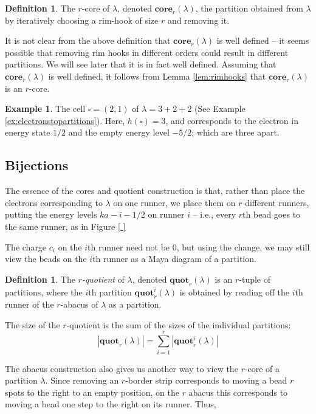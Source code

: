 \documentclass{amsart}[12pt]
\theoremstyle{definition}
\newtheorem{example}[dummy]{Example}
\newtheorem{definition}[dummy]{Definition}
\newcommand{\core}{\mathbf{core}}
\newcommand{\quot}{\mathbf{quot}}
\begin{document}
\begin{definition} 
The $r$-core of $\lambda$, denoted $\core_r(\lambda)$, the partition obtained from $\lambda$ by iteratively choosing a rim-hook of size $r$ and removing it.
\end{definition}

It is not clear from the above definition that $\core_r(\lambda)$ is well defined -- it seems possible that removing rim hooks in different orders could result in different partitions.  We will see later that it is in fact well defined.  Assuming that $\core_r(\lambda)$ is well defined, it follows from Lemma \ref{lem:rimhooks} that $\core_r(\lambda)$ is an $r$-core.


\begin{example}
The cell $\square=(2,1)$ of $\lambda=3+2+2$ (See Example \ref{ex:electronstopartitions}).
Here, $h(\square)=3$, and corresponds to the electron in energy state $1/2$
and the empty energy level $-5/2$; which are three apart.

\end{example}

\subsection{Bijections}

The essence of the cores and quotient construction is that, rather than place the electrons corresponding to $\lambda$ on one runner, we place them on $r$ different runners, putting the energy levels $ka-i-1/2$ on runner $i$ -- i.e., every $r$th bead goes to the same runner, as in Figure \ref{ }

The charge $c_i$ on the $i$th runner need not be 0, but using the change, we may still view the beads on the $i$th runner as a Maya diagram of a partition.  


\begin{definition} \label{def:quotients}
The \emph{$r$-quotient} of $\lambda$, denoted $\quot_r(\lambda)$ is an $r$-tuple of partitions, where the $i$th partition $\quot_r^i(\lambda)$ is obtained by reading off the $i$th runner of the $r$-abacus of $\lambda$ as a partition.

The size of the $r$-quotient is the sum of the sizes of the individual partitions: 
$$|\quot_r(\lambda)|=\sum_{i=1}^r |\quot_r^i(\lambda)|$$
\end{definition}

The abacus construction also gives us another way to view the $r$-core of a partition $\lambda$.  Since removing an $r$-border strip corresponds to moving a bead $r$ spots to the right to an empty position, on the $r$ abacus this corresponds to moving a bead one step to the right on its runner.  Thus, 
\end{document}
